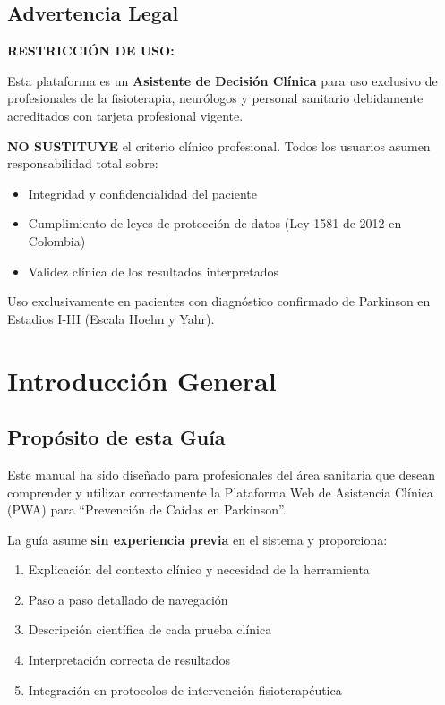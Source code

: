 \documentclass[12pt,a4paper,spanish,oneside]{book}
\begin{document}
\newpage
\section*{Advertencia Legal}

\begin{advertenciabox}
  \textbf{RESTRICCIÓN DE USO:}
  
  Esta plataforma es un \textbf{Asistente de Decisión Clínica} para uso exclusivo de profesionales de la fisioterapia, neurólogos y personal sanitario debidamente acreditados con tarjeta profesional vigente.
  
  \textbf{NO SUSTITUYE} el criterio clínico profesional. Todos los usuarios asumen responsabilidad total sobre:
  \begin{itemize}
    \item Integridad y confidencialidad del paciente
    \item Cumplimiento de leyes de protección de datos (Ley 1581 de 2012 en Colombia)
    \item Validez clínica de los resultados interpretados
  \end{itemize}
  
  Uso exclusivamente en pacientes con diagnóstico confirmado de Parkinson en Estadios I-III (Escala Hoehn y Yahr).
\end{advertenciabox}

\tableofcontents

\mainmatter

\chapter{Introducción General}

\section{Propósito de esta Guía}

Este manual ha sido diseñado para profesionales del área sanitaria que desean comprender y utilizar correctamente la Plataforma Web de Asistencia Clínica (PWA) para ``Prevención de Caídas en Parkinson''.

La guía asume \textbf{sin experiencia previa} en el sistema y proporciona:

\begin{enumerate}
  \item Explicación del contexto clínico y necesidad de la herramienta
  \item Paso a paso detallado de navegación
  \item Descripción científica de cada prueba clínica
  \item Interpretación correcta de resultados
  \item Integración en protocolos de intervención fisioterapéutica
\end{enumerate}
\end{document}
